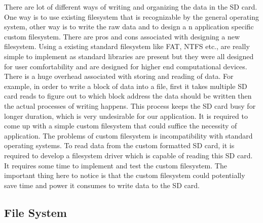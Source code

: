  There are lot of different ways of writing and organizing the data in the SD card. One way is to use existing filesystem that is recognizable by the general operating system, other way is to write the raw data and to design a n application specific custom filesystem. There are pros and cons associated with designing a new filesystem. Using a existing standard filesystem like FAT, NTFS etc., are really simple to implement as standard libraries are present but they were all designed for user comfortability and are designed for higher end computational devices. There is a huge overhead associated with storing and reading of data. For example, in order to write a block of data into a file, first it takes multiple SD card reads to figure out to which block address the data should be written then the actual processes of writing happens. This process keeps the SD card busy for longer duration, which is very undesirable for our application. It is required to come up with a simple custom filesystem that could suffice the necessity of application. The problems of custom filesystem is incompatibility with standard operating systems. To read data from the custom formatted SD card, it is required to develop a filesystem driver which is capable of reading this SD card. It requires some time to implement and test the custom filesystem. The important thing here to notice is that the custom filesystem could potentially save time and power it consumes to write data to the SD card.


\subsection{File System}\label{filesystem} 

